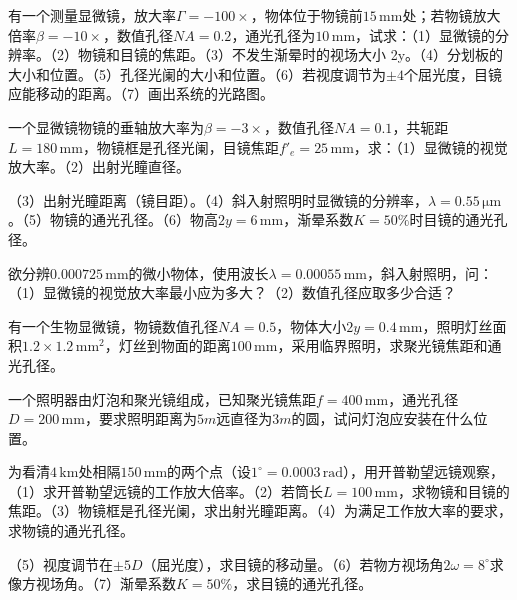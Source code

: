 \documentclass[standard, analysis, notocnum]{ExBook}
\newcommand{\answerarea}[1][8cm]{%
  \par\vspace{2mm}%
  \noindent{\color{themeColor!35}\rule{\linewidth}{0.4pt}}\par
  \noindent\begin{minipage}[t][#1][t]{\linewidth}\vspace{0pt}\end{minipage}\par
  \noindent{\color{themeColor!35}\rule{\linewidth}{0.4pt}}\par
}
\begin{document}
\begin{qitems}[startnum=3]
\qitem 有一个测量显微镜，放大率$\Gamma =-100\times$，物体位于物镜前$15\,\mathrm{mm}$处；若物镜放大倍率$\beta =-10\times$，数值孔径$NA=0.2$，通光孔径为$10\,\mathrm{mm}$，试求：（1）显微镜的分辨率。（2）物镜和目镜的焦距。（3）不发生渐晕时的视场大小 2y。（4）分划板的大小和位置。（5）孔径光阑的大小和位置。（6）若视度调节为$\pm 4$个屈光度，目镜应能移动的距离。（7）画出系统的光路图。
\label{q:142:start}
\answerarea[8cm]
\label{q:142:end}
\end{qitems}

\begin{qitems}[startnum=4]
\qitem 一个显微镜物镜的垂轴放大率为$\beta =-3\times$，数值孔径$NA=0.1$，共轭距$L=180\,\mathrm{mm}$，物镜框是孔径光阑，目镜焦距$f'_{e}=25\,\mathrm{mm}$，求：（1）显微镜的视觉放大率。（2）出射光瞳直径。
\par\noindent （3）出射光瞳距离（镜目距）。（4）斜入射照明时显微镜的分辨率，$\lambda =0.55\,\mathrm{\mu m}$。（5）物镜的通光孔径。（6）物高$2y=6\,\mathrm{mm}$，渐晕系数$K=50\%$时目镜的通光孔径。
\label{q:143:start}
\answerarea[8cm]
\label{q:143:end}
\end{qitems}

\begin{qitems}[startnum=5]
\qitem 欲分辨$0.000725\,\mathrm{mm}$的微小物体，使用波长$\lambda =0.00055\,\mathrm{mm}$，斜入射照明，问：（1）显微镜的视觉放大率最小应为多大？（2）数值孔径应取多少合适？
\label{q:144:start}
\answerarea[8cm]
\label{q:144:end}
\end{qitems}

\begin{qitems}[startnum=6]
\qitem 有一个生物显微镜，物镜数值孔径$NA=0.5$，物体大小$2y=0.4\,\mathrm{mm}$，照明灯丝面积$1.2\times 1.2\,\mathrm{mm}^{2}$，灯丝到物面的距离$100\,\mathrm{mm}$，采用临界照明，求聚光镜焦距和通光孔径。
\label{q:145:start}
\answerarea[8cm]
\label{q:145:end}
\end{qitems}

\begin{qitems}[startnum=7]
\qitem 一个照明器由灯泡和聚光镜组成，已知聚光镜焦距$f=400\,\mathrm{mm}$，通光孔径$D=200\,\mathrm{mm}$，要求照明距离为$5m$远直径为$3m$的圆，试问灯泡应安装在什么位置。
\label{q:146:start}
\answerarea[8cm]
\label{q:146:end}
\end{qitems}

\begin{qitems}[startnum=8]
\qitem 为看清$4\,\mathrm{km}$处相隔$150\,\mathrm{mm}$的两个点（设$1^{\circ}=0.0003\,\mathrm{rad}$），用开普勒望远镜观察，（1）求开普勒望远镜的工作放大倍率。（2）若筒长$L=100\,\mathrm{mm}$，求物镜和目镜的焦距。（3）物镜框是孔径光阑，求出射光瞳距离。（4）为满足工作放大率的要求，求物镜的通光孔径。
\par\noindent （5）视度调节在$\pm 5D$（屈光度），求目镜的移动量。（6）若物方视场角$2\omega =8^{\circ}$求像方视场角。（7）渐晕系数$K=50\%$，求目镜的通光孔径。
\label{q:147:start}
\answerarea[8cm]
\label{q:147:end}
\end{qitems}
\end{document}
